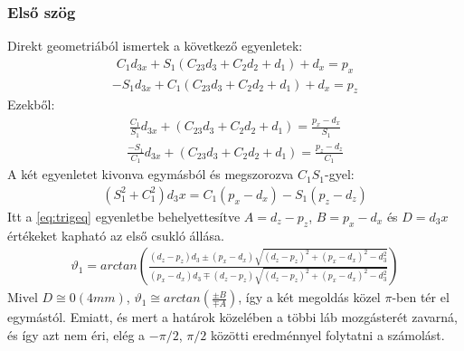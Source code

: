\documentclass{article}
\begin{document}
\subsubsection{Első szög}
Direkt geometriából ismertek a következő egyenletek:
\begin{align*}
C_1 d_{3x}+S_1 (C_{23} d_3+C_2 d_2+d_1)+d_x=p_x
\end{align*}
\begin{align*}
-S_1 d_{3x}+C_1 (C_{23} d_3+C_2 d_2+d_1)+d_x=p_z
\end{align*}
Ezekből:
\begin{align*}
\frac{C_1}{S_1}d_{3x}+(C_{23} d_3+C_2 d_2+d_1)=\frac{p_x-d_x}{S_1}
\end{align*}
\begin{align*}
\frac{-S_1}{C_1}d_{3x}+(C_{23} d_3+C_2 d_2+d_1)=\frac{p_z-d_z}{C_1}
\end{align*}
A két egyenletet kivonva egymásból és megszorozva $C_1 S_1$-gyel:
\begin{align*}
(S_1^2+C_1^2 ) d_3x=C_1 (p_x-d_x )-S_1 (p_z-d_z)
\end{align*}
Itt a \eqref{eq:trigeq} egyenletbe behelyettesítve $A=d_z-p_z$, $B=p_x-d_x$ és $D=d_3x$ értékeket kapható az első csukló állása.
\begin{align}
\vartheta_1 = arctan \left( \frac{(d_z-p_z) d_3\pm (p_x-d_x)\sqrt{(d_z-p_z)^2+(p_x-d_x)^2-d_3^2}}{(p_x-d_x) d_3\mp (d_z-p_z)\sqrt{(d_z-p_z)^2+(p_x-d_x)^2-d_3^2}} \right)
\end{align}
Mivel $D\cong0 (4 mm)$, $\vartheta_1\cong arctan\left(\frac{\pm B}{\mp A}\right)$, így a két megoldás közel $\pi$-ben tér el egymástól. Emiatt, és mert a határok közelében a többi láb mozgásterét zavarná, és így azt nem éri, elég a $-\pi/2$, $\pi/2$ közötti eredménnyel folytatni a számolást.
\end{document}
